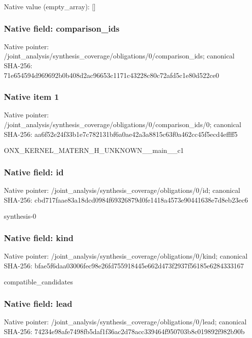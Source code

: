 \documentclass[10pt,a4paper]{article}
\begin{document}
Native value (empty\_\allowbreak{}array): []

\subsubsection{Native field: comparison\_\allowbreak{}ids}
Native pointer: /joint\_\allowbreak{}analysis/synthesis\_\allowbreak{}coverage/obligations/0/comparison\_\allowbreak{}ids; canonical SHA-256: 71e654594d969692b0b408d2ac96653c1171c43228c80c72afd5c1e80d522ce0

\subsubsection{Native item 1}
Native pointer: /joint\_\allowbreak{}analysis/synthesis\_\allowbreak{}coverage/obligations/0/comparison\_\allowbreak{}ids/0; canonical SHA-256: aa6f52e24f33b1e7c782131bf6a0ae42a3a8815c63f0a462cc45f5ecd4effff5

\begingroup\raggedright\sloppy ONX\_\allowbreak{}KERNEL\_\allowbreak{}MATERN\_\allowbreak{}H\_\allowbreak{}UNKNOWN\_\allowbreak{}\_\allowbreak{}main\_\allowbreak{}\_\allowbreak{}c1\par\endgroup

\subsubsection{Native field: id}
Native pointer: /joint\_\allowbreak{}analysis/synthesis\_\allowbreak{}coverage/obligations/0/id; canonical SHA-256: cbd717faae83a18dcd0984f69326879d0fe1418a4573e90441638e7d8eb23ec6

\begingroup\raggedright\sloppy synthesis-0\par\endgroup

\subsubsection{Native field: kind}
Native pointer: /joint\_\allowbreak{}analysis/synthesis\_\allowbreak{}coverage/obligations/0/kind; canonical SHA-256: bfae5f6daa03006fec98e26fd755918445e662d473f2937f56185e6284333167

\begingroup\raggedright\sloppy compatible\_\allowbreak{}candidates\par\endgroup

\subsubsection{Native field: lead}
Native pointer: /joint\_\allowbreak{}analysis/synthesis\_\allowbreak{}coverage/obligations/0/lead; canonical SHA-256: 74234e98afe7498fb5daf1f36ac2d78acc339464f950703b8c019892f982b90b
\end{document}
